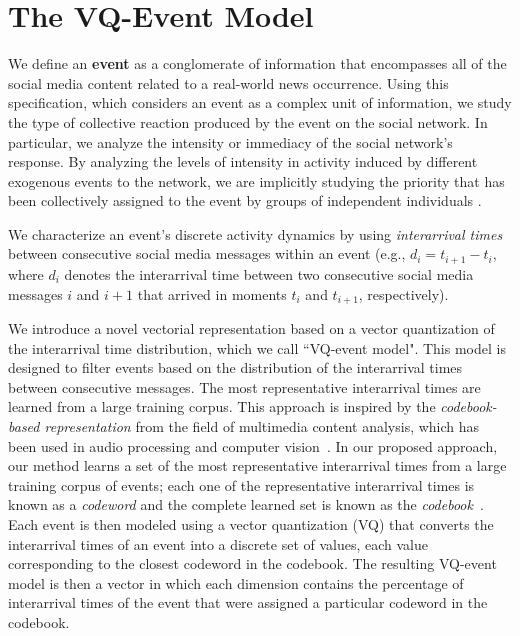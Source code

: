 \section{The VQ-Event Model}
 
We define an {\bf event} as a conglomerate of information that encompasses all
of the social media content related to a real-world news occurrence. 
%
Using this specification, which considers an event as a complex unit of
information, we study the type of collective reaction produced by the event on
the social network. 
%
In particular, we analyze the intensity or immediacy of the
social network's response. 
%
By analyzing the levels of intensity in activity induced by different exogenous
events to the network, we are implicitly studying the priority that has been
collectively assigned to the event by groups of independent individuals
\cite{barabasi2005origin, karsai2012universal}. 

We characterize an event's discrete activity dynamics by using
\emph{interarrival times} between consecutive social media messages within an
event (e.g., $d_i = t_{i+1}-t_i$, where $d_i$ denotes the interarrival time
between two consecutive social media messages $i$ and $i+1$ that arrived in
moments $t_i$ and $t_{i+1}$, respectively).


We introduce a novel vectorial representation based on a vector quantization of
the interarrival time distribution, which we call ``VQ-event model". 
%
This model is designed to filter events based on the distribution of the
interarrival times between consecutive messages.  
%
The most representative interarrival times are learned from a large training
corpus. 
%
This approach is inspired by the {\em codebook-based representation} from the
field of multimedia content analysis, which has been used in audio processing
and computer vision~\cite{ff,Vaizman}.
%
In our proposed approach, our method learns a set of the most representative
interarrival times from a large training corpus of events; 
%
each one of the representative interarrival times is known as a {\em codeword}
and the complete learned set is known as the {\em codebook}~\cite{Vaizman}. 
%
Each event is then modeled using a vector quantization (VQ) that converts the
interarrival times of an event into a discrete set of values, each value
corresponding to the closest codeword in the codebook. 
%
The resulting VQ-event model is then a vector in which each dimension contains
the percentage of interarrival times of the event that were assigned a
particular codeword in the codebook.

